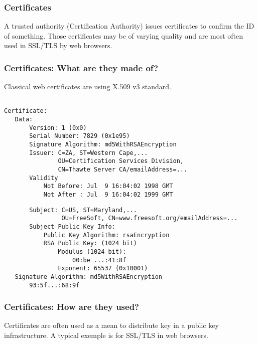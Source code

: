 
\begin{frame}
\frametitle{Certificates}
A trusted authority (Certification Authority) issues certificates to
confirm the ID of something. Those certificates may be of varying
quality and are most often used in SSL/TLS by web browsers.
\end{frame}


\begin{frame}[fragile]
\frametitle{Certificates: What are they made of?}
Classical web certificates are using X.509 v3 standard.

\small
\begin{verbatim}

Certificate:
   Data:
       Version: 1 (0x0)
       Serial Number: 7829 (0x1e95)
       Signature Algorithm: md5WithRSAEncryption
       Issuer: C=ZA, ST=Western Cape,...
               OU=Certification Services Division,
               CN=Thawte Server CA/emailAddress=...
       Validity
           Not Before: Jul  9 16:04:02 1998 GMT
           Not After : Jul  9 16:04:02 1999 GMT
\end{verbatim}

\end{frame}



\begin{frame}[fragile]

\small
\begin{verbatim}
       Subject: C=US, ST=Maryland,...
                OU=FreeSoft, CN=www.freesoft.org/emailAddress=...
       Subject Public Key Info:
           Public Key Algorithm: rsaEncryption
           RSA Public Key: (1024 bit)
               Modulus (1024 bit):
                   00:be ...:41:8f
               Exponent: 65537 (0x10001)
   Signature Algorithm: md5WithRSAEncryption
       93:5f...:68:9f
\end{verbatim}

\end{frame}



\begin{frame}
\frametitle{Certificates: How are they used?}
Certificates are often used as a mean to distribute key in a public
key infrastructure. A typical exemple is for SSL/TLS in web browsers.
\end{frame}

